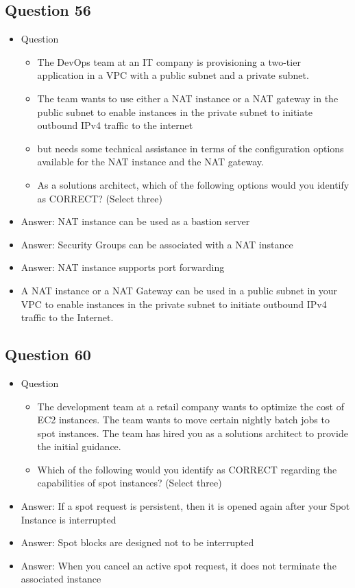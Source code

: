 \documentclass[]{scrartcl}
\begin{document}
\subsection{Question 56}
\begin{itemize}
	\item Question
	\begin{itemize}
		\item The DevOps team at an IT company is provisioning a two-tier application in a VPC with a public subnet and a private subnet. 
		\item The team wants to use either a NAT instance or a NAT gateway in the public subnet to enable instances in the private subnet to initiate outbound IPv4 traffic to the internet 
		\item but needs some technical assistance in terms of the configuration options available for the NAT instance and the NAT gateway.
		\item As a solutions architect, which of the following options would you identify as CORRECT? (Select three)
	\end{itemize}
	\item Answer: NAT instance can be used as a bastion server
	\item Answer: Security Groups can be associated with a NAT instance
	\item Answer: NAT instance supports port forwarding
	\item A NAT instance or a NAT Gateway can be used in a public subnet in your VPC to enable instances in the private subnet to initiate outbound IPv4 traffic to the Internet.
\end{itemize}

\subsection{Question 60}
\begin{itemize}
	\item Question
	\begin{itemize}
		\item The development team at a retail company wants to optimize the cost of EC2 instances. The team wants to move certain nightly batch jobs to spot instances. The team has hired you as a solutions architect to provide the initial guidance.
		\item Which of the following would you identify as CORRECT regarding the capabilities of spot instances? (Select three)
	\end{itemize}
	\item Answer: If a spot request is persistent, then it is opened again after your Spot Instance is interrupted
	\item Answer: Spot blocks are designed not to be interrupted
	\item Answer: When you cancel an active spot request, it does not terminate the associated instance
\end{itemize}
\end{document}
